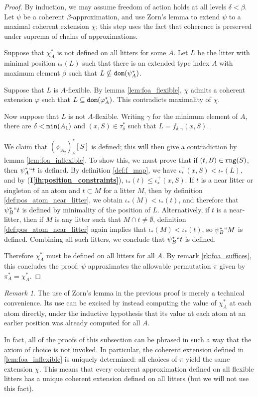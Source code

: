 \documentclass[112pt]{article}
\theoremstyle{definition}
\theoremstyle{remark}
\newtheorem{remark}[theorem]{Remark}
\newcommand{\ihref}[1]{(\textbf{I\ref{#1}})}
\begin{document}
\begin{proof}
  By induction, we may assume freedom of action holds at all levels $\delta < \beta$.
  Let $\psi$ be a coherent $\beta$-approximation, and use Zorn's lemma to extend $\psi$ to a maximal coherent extension $\chi$; this step uses the fact that coherence is preserved under suprema of chains of approximations.

  Suppose that $\chi_A^*$ is not defined on all litters for some $A$.
  Let $L$ be the litter with minimal position $\iota_*(L)$ such that there is
  an extended type index $A$
  with maximum element $\beta$ such that $L \nsubseteq {\tt dom}(\psi_A^*)$.

  Suppose that $L$ is $A$-flexible.
  By lemma \ref{lem:foa_flexible}, $\chi$ admits a coherent extension $\varphi$ such that $L \subseteq {\tt dom}(\varphi_A^*)$.
  This contradicts maximality of $\chi$.

  Now suppose that $L$ is not $A$-flexible.
  Writing $\gamma$ for the minimum element of $A$, there are $\delta < {\tt min}(A_1)$ and $(x, S) \in \tau_\delta^*$ such that $L = f_{\delta,\gamma}(x, S)$.


  We claim that $(\psi_{A_2})_\delta^*[S]$ is defined; this will then give a contradiction by lemma \ref{lem:foa_inflexible}.
  To show this, we must prove that if $(t, B) \in {\tt rng}(S)$, then $\psi_A^*``t$ is defined.
  By definition \ref{def:f_map}, we have $\iota_*^+(x, S) < \iota_*(L)$, and by \ihref{ih:position_constraints}, $\iota_*(t) \leq \iota_*^+(x, S)$.
  If $t$ is a near litter or singleton of an atom and $t \subset M$ for a litter $M$, then by definition \ref{def:pos_atom_near_litter}, we obtain $\iota_*(M) < \iota_*(t)$, and therefore that $\psi_B^*``t$ is defined by minimality of the position of $L$.
  Alternatively, if $t$ is a near-litter, then if $M$ is any litter such that $M \cap t \neq \emptyset$, definition \ref{def:pos_atom_near_litter} again implies that $\iota_*(M) < \iota_*(t)$, so $\psi_B^*``M$ is defined.
  Combining all such litters, we conclude that $\psi_B^*``t$ is defined.

  Therefore $\chi_A^*$ must be defined on all litters for all $A$.
  By remark \ref{rk:foa_suffices}, this concludes the proof: $\psi$ approximates the allowable permutation $\pi$ given by $\pi_A^* = \chi_A^*$.
\end{proof}
\begin{remark}
  The use of Zorn's lemma in the previous proof is merely a technical convenience.
  Its use can be excised by instead computing the value of \( \chi_A^* \) at each atom directly, under the inductive hypothesis that its value at each atom at an earlier position was already computed for all \( A \).

  In fact, all of the proofs of this subsection can be phrased in such a way that the axiom of choice is not invoked.
  In particular, the coherent extension defined in \ref{lem:foa_inflexible} is uniquely determined: all choices of \( \pi \) yield the same extension \( \chi \).
  This means that every coherent approximation defined on all flexible litters has a unique coherent extension defined on all litters (but we will not use this fact).
\end{remark}
\end{document}
